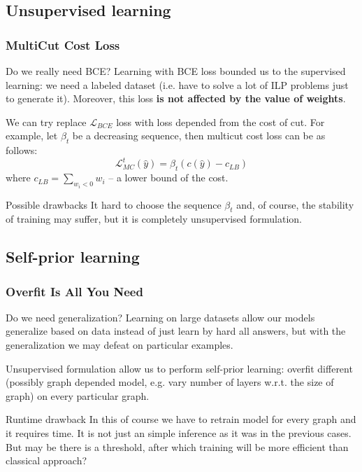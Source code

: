 \documentclass{beamer}
\begin{document}
\subsection{Unsupervised learning}

\begin{frame}
    \frametitle{MultiCut Cost Loss}

    \begin{block}{Do we really need BCE?}
        Learning with BCE loss bounded us to the supervised learning: we need
        a labeled dataset (i.e. have to solve a lot of ILP problems just to
        generate it). Moreover, this loss \textbf{is not affected
            by the value of weights}.
    \end{block}

    We can try replace $\mathcal{L}_{BCE}$ loss with
    loss depended from the cost of cut. For example, let $\beta_t$ be
    a decreasing sequence, then multicut cost loss can be as follows:
    \[
        \mathcal{L}_{MC}^{t} (\hat{y}) = \beta_t \left( c(\hat{y}) - c_{LB} \right)
    \]
    where $c_{LB} = \sum\limits_{w_i < 0} w_i$ -- a lower bound of the cost.

    \begin{alertblock}{Possible drawbacks}
        It hard to choose the sequence $\beta_t$ and, of course,
        the stability of training may suffer, but it is completely
        unsupervised formulation.
    \end{alertblock}

\end{frame}

\subsection{Self-prior learning}

\begin{frame}
    \frametitle{Overfit Is All You Need}

    \begin{block}{Do we need generalization?}
        Learning on large datasets allow our models generalize
        based on data instead of just learn by hard all answers,
        but with the generalization we may defeat on particular examples.
    \end{block}

    Unsupervised formulation allow us to perform self-prior
    learning: overfit different (possibly graph depended model, e.g. vary
    number of layers w.r.t. the size of graph) on
    every particular graph.

    \begin{alertblock}{Runtime drawback}
        In this of course we have to retrain model for every
        graph and it requires time. It is not just an simple inference
        as it was in the previous cases. But may be there is a threshold, after
        which training will be more efficient than classical approach?
    \end{alertblock}

\end{frame}
\end{document}
